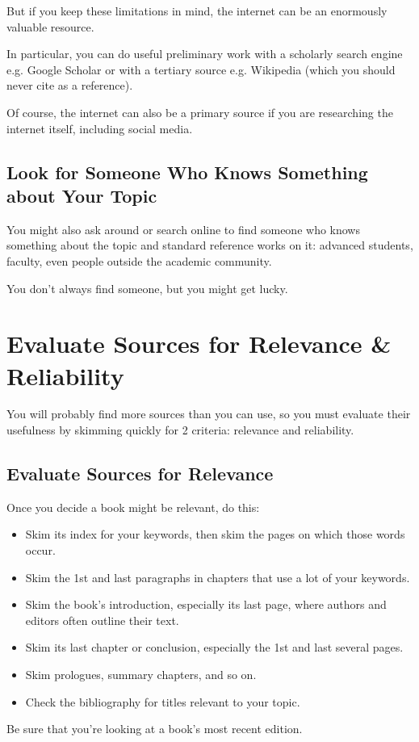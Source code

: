 \documentclass[oneside]{book}
\numberwithin{equation}{section}
\begin{document}
%
But if you keep these limitations in mind, the internet can be an enormously valuable resource.

In particular, you can do useful preliminary work with a scholarly search engine e.g. Google Scholar or with a tertiary source e.g. Wikipedia (which you should never cite as a reference).

Of course, the internet can also be a primary source if you are researching the internet itself, including social media.

\subsection{Look for Someone Who Knows Something about Your Topic}
You might also ask around or search online to find someone who knows something about the topic and standard reference works on it: advanced students, faculty, even people outside the academic community.

You don't always find someone, but you might get lucky.

\section{Evaluate Sources for Relevance \& Reliability}
You will probably find more sources than you can use, so you must evaluate their usefulness by skimming quickly for 2 criteria: relevance and reliability.

\subsection{Evaluate Sources for Relevance}
Once you decide a book might be relevant, do this:
\begin{itemize}
    \item Skim its index for your keywords, then skim the pages on which those words occur.
    \item Skim the 1st and last paragraphs in chapters that use a lot of your keywords.
    \item Skim the book's introduction, especially its last page, where authors and editors often outline their text.
    \item Skim its last chapter or conclusion, especially the 1st and last several pages.
    \item Skim prologues, summary chapters, and so on.
    \item Check the bibliography for titles relevant to your topic.
\end{itemize}
Be sure that you're looking at a book's most recent edition.
\end{document}
